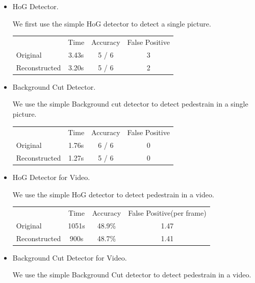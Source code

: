 \documentclass[a4paper]{article}
\begin{document}
\begin{enumerate}
\begin{itemize}
\item HoG Detector.

We first use the simple HoG detector to detect a single picture.
\begin{center}
\begin{tabular}{l | c | c | c}
\hline
                & Time  & Accuracy  & False Positive \\
Original        & 3.43s & 5 / 6     & 3              \\
Reconstructed   & 3.20s & 5 / 6     & 2              \\
\hline
\end{tabular}
\end{center}

\item Background Cut Detector.

We use the simple Background cut detector to detect pedestrain in a single picture.

\begin{center}
\begin{tabular}{l | c | c | c}
\hline
                & Time  & Accuracy  & False Positive \\
Original        & 1.76s & 6 / 6     & 0              \\
Reconstructed   & 1.27s & 5 / 6     & 0              \\
\hline
\end{tabular}
\end{center}

\item HoG Detector for Video.

We use the simple HoG detector to detect pedestrain in a video.

\begin{center}
\begin{tabular}{l | c | c | c}
\hline
                & Time  & Accuracy  & False Positive(per frame) \\
Original        & 1051s  &   48.9\%        &  1.47           \\
Reconstructed   & 900s &     48.7\%        &    1.41        \\
\hline
\end{tabular}
\end{center}

\item Background Cut Detector for Video.

We use the simple Background Cut detector to detect pedestrain in a video.


\end{itemize}
\end{enumerate}
\end{document}
